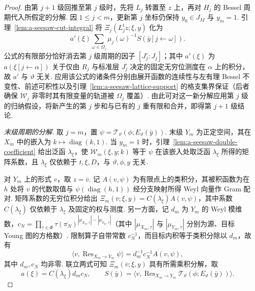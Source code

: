 \begin{proof}
由第 $j+1$ 级回推至第 $j$ 级时，先将 $L_j$ 转置至 $z$ 上，再对 $H_j$ 的 Bessel 周期代入所假定的分解. 因 $1\le j<m$，更新第 $j$ 坐标仍保持 $y_0\in J_M$ 与 $y_m=1$. 引理~\ref{lem:a-seesaw-cut-integral} 将 $\Xi_j(L_j^{\mathrm t}z;\xi,y)$ 化为
\[
 a'(\xi)\sum_{\omega\in\Omega_j}
    \mu_j(\omega)^{-1} S(\bar y[j\leftarrow\omega]).
\]
公式的有限部分恰好消去第 $j$ 级周期的因子 $[J_j^\circ:J_j]$；其中 $a'(\xi)$ 为 $a(\xi[j\leftarrow\alpha])$ 关于仅由 $R_j$ 与标准层 $J_j^\circ$ 决定的固定无穷位测度在 $\alpha$ 上的积分，故 $a'$ 与 $\vartheta$ 无关. 应用该公式的诸条件分别由展开函数的连续性与左有理 Bessel 不变性、前述可积性以及引理~\ref{lem:a-seesaw-lattice-support} 的格支集界保证（后者确保 $\mathcal W_j$ 非零时其有限变量的轨道被 $\Omega_j$ 覆盖）. 由此可对这一新分解应用第 $j$ 级的归纳假设，将新产生的第 $j$ 步和与已有的 $j$ 重有限和合并，即得第 $j+1$ 级结论.

\emph{末级周期的分解.}
取 $j=m$，置 $\psi=\mathcal T_\vartheta(\phi;E_\vartheta(\bar y))$. 末级 $Y_m$ 为正定空间，其在 $X_m$ 中的嵌入为 $k\mapsto\operatorname{diag}(k,1)$. 当 $y_m=1$ 时，引理~\ref{lem:a-seesaw-double-coefficient} 给出泛函 $\lambda_\xi$，使 $\mathcal W_m(\xi,y;k)$ 等于 $\psi$ 在该嵌入处取泛函 $\lambda_\xi$ 所得的矩阵系数，且 $\lambda_\xi$ 仅依赖于 $t,\xi,D$，与 $\vartheta,\phi,y$ 无关.

对 $Y_m$ 上的形式 $v$，取 $z=\overline v$. 记 $A(v,\psi)$ 为有限点上的类积分，其被积函数为在 $h$ 处将 $v$ 的代数取值与 $\psi(\operatorname{diag}(h,1))$ 经分支映射所得 Weyl 向量作 Gram 配对. 矩阵系数的无穷位积分给出 $\Xi_m(\overline v;\xi,y)=C(\lambda_\xi)A(v,\psi)$，其中系数 $C(\lambda_\xi)$ 仅依赖于 $\lambda_\xi$ 及固定的权与测度. 另一方面，记 $d_m$ 为 $Y_m$ 的 Weyl 模维数，$c_N=\prod_{\tau\in\Phi}\tau(\overline{\pi_N})^{|\mu_{X_m,\tau}|-|\mu_{Y_m,\tau}|}$（其中 $|\mu_{X_m,\tau}|$ 与 $|\mu_{Y_m,\tau}|$ 分别为源、目标 Young 图的方格数）. 限制算子自带常数 $c_N^{-1}$，而目标内积等于类积分除以 $d_m$，故有
\[
 \big\langle v,\operatorname{Res}_{X_m\to Y_m}\psi\big\rangle
  =d_m^{-1}c_N^{-1}A(v,\psi),
\]
其中 $d_m,c_N$ 均非零. 联立两式可知 $\Xi_m(\overline v;\xi,y)$ 具有所需乘积分解，取
\[
 a(\xi)=C(\lambda_\xi)d_mc_N,\qquad
 S(\bar y)=
 \big\langle v,\operatorname{Res}_{X_m\to Y_m}
                 \mathcal T_\vartheta(\phi;E_\vartheta(\bar y))\big\rangle .
\]


\end{proof}
